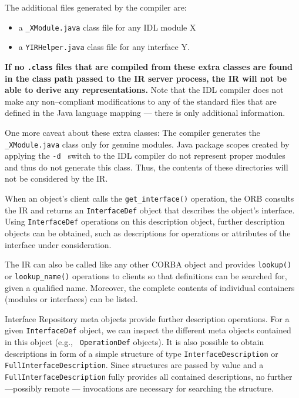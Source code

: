 
The additional files generated by the compiler are:
\begin{itemize}
\item a {\tt \_XModule.java} class file for any IDL module X
\item a {\tt YIRHelper.java} class file for any interface Y.
\end{itemize}

\textbf{If no {\tt .class} files that  are compiled from  these extra
classes are found  in the class path passed  to the IR server  process,
the IR will not  be able  to derive any  representations.}
Note that  the IDL compiler does not make any non--compliant modifications
to any of the standard files that are defined in the Java language mapping
 --- there is only additional information.

One more caveat about these  extra classes: The compiler generates the
{\tt  \_XModule.java} class  only  for genuine  modules. Java  package
scopes created by applying the {\tt -d } switch to the IDL compiler do
not  represent   proper  modules  and   thus  do  not   generate  this
class. Thus, the contents of  these directories will not be considered
by the IR.

When an  object's client  calls the {\tt  get\_interface()} operation,
the ORB consults the IR  and returns an {\tt InterfaceDef} object that
describes the object's  interface. Using {\tt InterfaceDef} operations
on  this  description  object,  further  description  objects  can  be
obtained,  such as descriptions  for operations  or attributes  of the
interface under consideration.

The IR  can also be  called like any  other CORBA object  and provides
{\tt lookup()}  or {\tt lookup\_name()} operations to  clients so that
definitions can be searched for, given a qualified name. Moreover, the
complete contents of individual containers (modules or interfaces) can
be listed.

Interface   Repository  meta   objects  provide   further  description
operations. For a given {\tt  InterfaceDef} object, we can inspect the
different  meta   objects  contained   in  this  object   (e.g.,  {\tt
OperationDef} objects). It is  also possible to obtain descriptions in
form of a simple structure  of type {\tt InterfaceDescription} or {\tt
FullInterfaceDescription}. Since structures are  passed by value and a
{\tt   FullInterfaceDescription}    fully   provides   all   contained
descriptions,  no  further  ---possibly  remote  ---  invocations  are
necessary for searching the structure.

